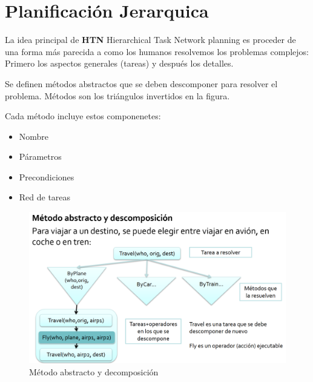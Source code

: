 \section{Planificación Jerarquica}


La idea principal de \textbf{HTN} Hierarchical Task Network planning es proceder de una forma más parecida
a como los humanos resolvemos los problemas complejos:
Primero los aspectos generales (tareas) y después los detalles.


\begin{paracol}{2}
   
   Se definen métodos abstractos que se deben descomponer
   para resolver el problema.
   Métodos son los triángulos invertidos en la figura.

   Cada método incluye estos componenetes:
   \begin{itemize}
      \item Nombre
      \item Párametros
      \item Precondiciones
      \item Red de tareas
   \end{itemize}
   \switchcolumn

   \begin{figure}[htbp]
      \centering
      \includegraphics{images/02/htn.png}
      \caption{Método abstracto y decomposición}
      \label{fig:02/htn}
   \end{figure}
\end{paracol}


